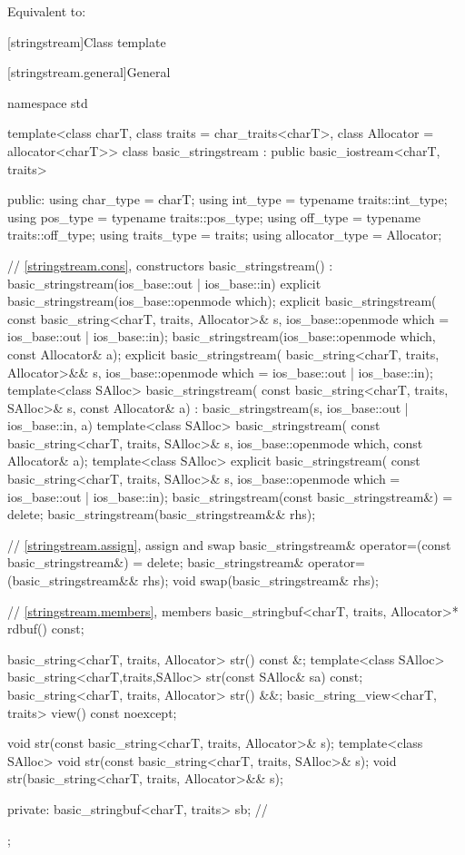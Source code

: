 \begin{itemdescr}
\pnum
\effects
Equivalent to: 
\end{itemdescr}

[stringstream]{Class template }

[stringstream.general]{General}

%
\begin{codeblock}
namespace std {
  template<class charT, class traits = char_traits<charT>,
           class Allocator = allocator<charT>>
  class basic_stringstream : public basic_iostream<charT, traits> {
  public:
    using char_type      = charT;
    using int_type       = typename traits::int_type;
    using pos_type       = typename traits::pos_type;
    using off_type       = typename traits::off_type;
    using traits_type    = traits;
    using allocator_type = Allocator;

    // \ref{stringstream.cons}, constructors
    basic_stringstream() : basic_stringstream(ios_base::out | ios_base::in) {}
    explicit basic_stringstream(ios_base::openmode which);
    explicit basic_stringstream(
      const basic_string<charT, traits, Allocator>& s,
      ios_base::openmode which = ios_base::out | ios_base::in);
    basic_stringstream(ios_base::openmode which, const Allocator& a);
    explicit basic_stringstream(
      basic_string<charT, traits, Allocator>&& s,
      ios_base::openmode which = ios_base::out | ios_base::in);
    template<class SAlloc>
      basic_stringstream(
        const basic_string<charT, traits, SAlloc>& s, const Allocator& a)
        : basic_stringstream(s, ios_base::out | ios_base::in, a) {}
    template<class SAlloc>
      basic_stringstream(
        const basic_string<charT, traits, SAlloc>& s,
        ios_base::openmode which, const Allocator& a);
    template<class SAlloc>
      explicit basic_stringstream(
        const basic_string<charT, traits, SAlloc>& s,
        ios_base::openmode which = ios_base::out | ios_base::in);
    basic_stringstream(const basic_stringstream&) = delete;
    basic_stringstream(basic_stringstream&& rhs);

    // \ref{stringstream.assign}, assign and swap
    basic_stringstream& operator=(const basic_stringstream&) = delete;
    basic_stringstream& operator=(basic_stringstream&& rhs);
    void swap(basic_stringstream& rhs);

    // \ref{stringstream.members}, members
    basic_stringbuf<charT, traits, Allocator>* rdbuf() const;

    basic_string<charT, traits, Allocator> str() const &;
    template<class SAlloc>
      basic_string<charT,traits,SAlloc> str(const SAlloc& sa) const;
    basic_string<charT, traits, Allocator> str() &&;
    basic_string_view<charT, traits> view() const noexcept;

    void str(const basic_string<charT, traits, Allocator>& s);
    template<class SAlloc>
      void str(const basic_string<charT, traits, SAlloc>& s);
    void str(basic_string<charT, traits, Allocator>&& s);

  private:
    basic_stringbuf<charT, traits> sb;  // \expos
  };
}
\end{codeblock}

